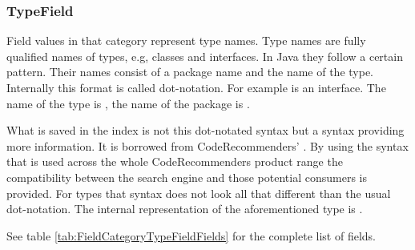 \subsubsection{TypeField}
\label{sec:FieldCategoryTypeField}

Field values in that category represent type names. 
Type names are fully qualified names of types, e.g, classes and interfaces. 
In Java they follow a certain pattern. Their names consist of a package name and the name of the type. 
Internally this format is called dot-notation. For example  is an interface. 
The name of the type is , the name of the package is .

What is saved in the index is not this dot-notated syntax but a syntax providing more information. It is borrowed from CodeRecommenders' . 
By using the syntax that is used across the whole CodeRecommenders product range the compatibility between the search engine and those potential consumers is provided. 
For types that syntax does not look all that different than the usual dot-notation. The internal representation of the aforementioned type  is .  

See table \ref{tab:FieldCategoryTypeFieldFields} for the complete list of fields.

